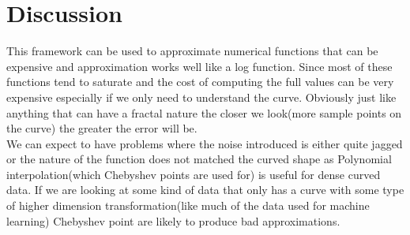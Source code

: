\documentclass{article}
\begin{document}
\section{Discussion}
This framework can be used to approximate numerical functions that can be expensive and approximation works well like a log function. Since most of these functions tend to saturate and the cost of computing the full values can be very expensive especially if we only need to understand the curve. Obviously just like anything that can have a fractal nature the closer we look(more sample points on the curve) the greater the error will be. \\
We can expect to have problems where the noise introduced is either quite jagged or the nature of the function does not matched the curved shape as Polynomial interpolation(which Chebyshev points are used for) is useful for dense curved data. If we are looking at some kind of data that only has a curve with some type of higher dimension transformation(like much of the data used for machine learning) Chebyshev point are likely to produce bad approximations.
\end{document}
